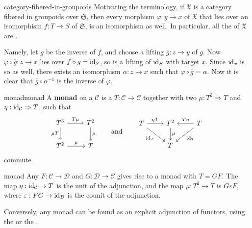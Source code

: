 \begin{example}{category-fibered-in-groupoids}
    Motivating the terminology, if $\mathfrak{X}$ is a category fibered in groupoids over $\mathfrak{S}$, then every morphism $\varphi : y \to x$ of $\mathfrak{X}$ that lies over an isomorphism $f : T \to S$ of $\mathfrak{S}$, is an isomorphism as well. In particular, all the  of $\mathfrak{X}$ are .

    Namely, let $g$ be the inverse of $f$, and choose a lifting $\overline{g} : z \to y$ of $g$. Now $\varphi \circ \overline{g} : z \to x$ lies over $f \circ g = \text{id}_S$, so is a lifting of $\text{id}_S$ with target $x$. Since $\text{id}_x$ is so as well, there exists an isomorphism $\alpha : z \to x$ such that $\varphi \circ \overline{g} = \alpha$. Now it is clear that $\overline{g} \circ \alpha^{-1}$ is the inverse of $\varphi$.
\end{example}

\begin{topic}{monad}{monad}
    A \textbf{monad} on a  $\mathcal{C}$ is a  $T : \mathcal{C} \to \mathcal{C}$ together with two  $\mu : T^2 \Rightarrow T$ and $\eta : \text{id}_{\mathcal{C}} \Rightarrow T$, such that
    \[ \begin{tikzcd} T^3 \arrow{r}{T \mu} \arrow[swap]{d}{\mu T} & T^2 \arrow{d}{\mu} \\ T^2 \arrow{r}{\mu} & T \end{tikzcd} \qquad \text{and} \qquad \begin{tikzcd} T \arrow{r}{\eta T} \arrow[swap]{dr}{\id_T} & T^2 \arrow{d}{\mu} & \arrow[swap]{l}{T \eta} T \arrow{ld}{\id_T} \\ & T & \end{tikzcd} \]
    commute.
\end{topic}

\begin{example}{monad}
    Any  $F : \mathcal{C} \to \mathcal{D}$ and $G : \mathcal{D} \to \mathcal{C}$ gives rise to a monad with $T = GF$. The map $\eta : \text{id}_{\mathcal{C}} \to T$ is the unit of the adjunction, and the map $\mu : T^2 \to T$ is $G \varepsilon F$, where $\varepsilon : FG \to \text{id}_{\mathcal{D}}$ is the counit of the adjunction.
    
    Conversely, any monad can be found as an explicit adjunction of functors, using the  or the .
\end{example}

